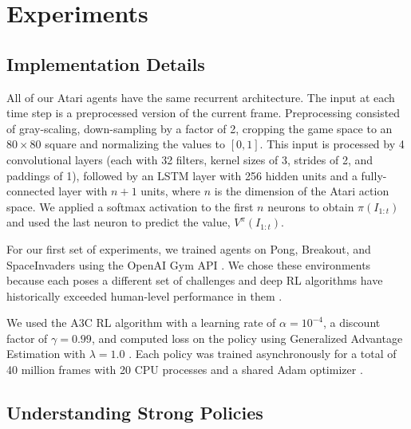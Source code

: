 \documentclass{article}
\begin{document}
\section{Experiments} \label{sec:experiments}


\subsection{Implementation Details} 

All of our Atari agents have the same recurrent architecture. The input at each time step is a preprocessed version of the current frame. Preprocessing consisted of gray-scaling, down-sampling by a factor of 2, cropping the game space to an $80 \times 80$ square and normalizing the values to $[0,1]$. This input is processed by 4 convolutional layers (each with 32 filters, kernel sizes of 3, strides of 2, and paddings of 1), followed by an LSTM layer with 256 hidden units and a fully-connected layer with $n+1$ units, where $n$ is the dimension of the Atari action space. We applied a softmax activation to the first $n$ neurons to obtain $\pi(I_{1:t})$ and used the last neuron to predict the value, $V^{\pi}(I_{1:t})$.

For our first set of experiments, we trained agents on Pong, Breakout, and SpaceInvaders using the OpenAI Gym API \cite{Brockman2016OpenAIGym,Bellemare2013TheAgents}. We chose these environments because each poses a different set of challenges and deep RL algorithms have historically exceeded human-level performance in them \cite{Mnih2015Human-levelLearning}.

We used the A3C RL algorithm \cite{Mnih2016AsynchronousLearning} with a learning rate of $\alpha=10^{-4}$, a discount factor of $\gamma=0.99$, and computed loss on the policy using Generalized Advantage Estimation with $\lambda=1.0$ \cite{Schulman2016HighEstimation}. Each policy was trained asynchronously for a total of 40 million frames with 20 CPU processes and a shared Adam optimizer 
\cite{Kingma2014Adam:Optimization}.

\subsection{Understanding Strong Policies}
\end{document}
